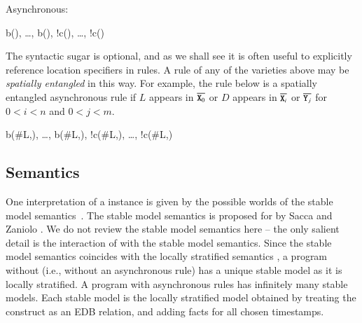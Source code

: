 %

Asynchronous:

\begin{Drules}
        {b(), \ldots, b(), !c(), \ldots, !c()}
\end{Drules}

The syntactic sugar is optional, and as we shall see it is often useful to explicitly reference location specifiers in rules.  A rule of any of the
varieties above may be \emph{spatially entangled} in this way. For example, the rule below is a spatially entangled asynchronous rule if $L$ appears
in $\od{X\sub{0}}$ or $D$ appears in $\od{X\sub{i}}$ or $\od{Y\sub{j}}$ for $0 < i < n$ and $0 < j < m$.

\begin{Drules}
        {b(\#L,), \ldots, b(\#L,), !c(\#L,), \ldots, !c(\#L,)}
\end{Drules}


\subsection{Semantics}
One interpretation of a \lang instance is given by the possible worlds of the
stable model semantics~\cite{stable-model}.  The stable model semantics is proposed for  by Sacca and Zaniolo .
We do not review the stable model
semantics here -- the only salient detail is the interaction of 
with the stable model semantics.  Since the stable model semantics coincides with the locally stratified semantics , a \lang program without  (i.e., without an asynchronous rule) has a unique stable model as it is locally stratified.  A \lang program with asynchronous rules has infinitely many stable models.  Each stable model is the locally stratified model obtained by treating the  construct as an EDB relation, and adding facts for all chosen timestamps.

